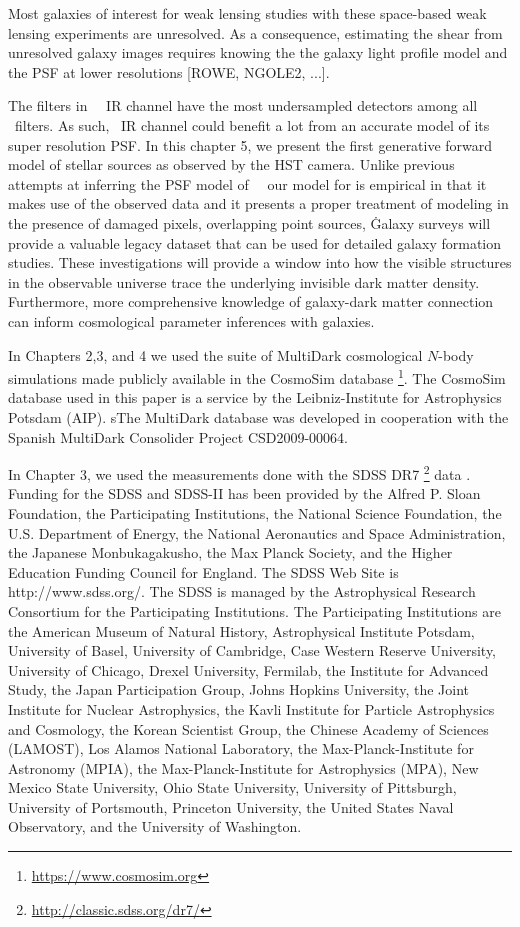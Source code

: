 Most galaxies of interest for weak lensing studies with these space-based weak lensing experiments are unresolved. 
As a consequence, estimating the shear from unresolved galaxy images requires 
knowing the the galaxy light profile model and the PSF at lower resolutions [ROWE, NGOLE2, ...].

The filters in \hst\ \wfc\ IR channel have the most undersampled detectors among all \hst\ filters. 
As such, \hst \wfc\ IR channel could benefit a lot from an accurate model of its super resolution PSF. 
In this chapter 5, we present the first generative forward model of stellar sources as observed by the HST camera.
Unlike previous attempts at inferring the PSF model of \hst\ \wfc\, our model for is empirical in that it makes 
use of the observed data and it presents a proper treatment of modeling in the presence of damaged pixels, overlapping 
point sources, \etc\.  

Galaxy surveys will provide a valuable legacy dataset that can be used for detailed galaxy formation studies. 
These investigations will provide a window into how the visible structures in the observable universe 
trace the underlying invisible dark matter density. Furthermore, more comprehensive knowledge of galaxy-dark matter connection 
can inform cosmological parameter inferences with galaxies. 


In Chapters 2,3, and 4 we used the suite of MultiDark cosmological $N$-body simulations made publicly available in the CosmoSim database \footnote{\url{https://www.cosmosim.org}}. The CosmoSim database used in this paper is a service by the Leibniz-Institute for Astrophysics Potsdam (AIP). sThe MultiDark database was developed in cooperation with the Spanish MultiDark Consolider Project CSD2009-00064.

In Chapter 3, we used the measurements done with the SDSS DR7 \footnote{\url{http://classic.sdss.org/dr7/}} data \citep{abazajian2009}. 
Funding for the SDSS and SDSS-II has been provided by the Alfred P. Sloan Foundation, the Participating Institutions, the National Science Foundation, the U.S. Department of Energy, the National Aeronautics and Space Administration, the Japanese Monbukagakusho, the Max Planck Society, and the Higher Education Funding Council for England. The SDSS Web Site is http://www.sdss.org/. The SDSS is managed by the Astrophysical Research Consortium for the Participating Institutions. The Participating Institutions are the American Museum of Natural History, Astrophysical Institute Potsdam, University of Basel, University of Cambridge, Case Western Reserve University, University of Chicago, Drexel University, Fermilab, the Institute for Advanced Study, the Japan Participation Group, Johns Hopkins University, the Joint Institute for Nuclear Astrophysics, the Kavli Institute for Particle Astrophysics and Cosmology, the Korean Scientist Group, the Chinese Academy of Sciences (LAMOST), Los Alamos National Laboratory, the Max-Planck-Institute for Astronomy (MPIA), the Max-Planck-Institute for Astrophysics (MPA), New Mexico State University, Ohio State University, University of Pittsburgh, University of Portsmouth, Princeton University, the United States Naval Observatory, and the University of Washington.

